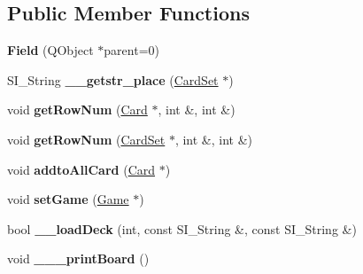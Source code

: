 \subsection*{Public Member Functions}
\begin{DoxyCompactItemize}
\item 
\mbox{\label{class_field_ae52ac347bd3fc1298fe0682c215cc950}} 
{\bfseries Field} (Q\+Object $\ast$parent=0)
\item 
\mbox{\label{class_field_a45b07177d91e5c8e43cc9506a0fc3ee7}} 
S\+I\+\_\+\+String {\bfseries \+\_\+\+\_\+getstr\+\_\+place} (\hyperlink{class_card_set}{Card\+Set} $\ast$)
\item 
\mbox{\label{class_field_a60541c561e9b2298b120a4734336c3f8}} 
void {\bfseries get\+Row\+Num} (\hyperlink{class_card}{Card} $\ast$, int \&, int \&)
\item 
\mbox{\label{class_field_ac44aee7eeb56a276953e00e92364c7ba}} 
void {\bfseries get\+Row\+Num} (\hyperlink{class_card_set}{Card\+Set} $\ast$, int \&, int \&)
\item 
\mbox{\label{class_field_ad73cca756ca943cf7e40a2b54735deab}} 
void {\bfseries addto\+All\+Card} (\hyperlink{class_card}{Card} $\ast$)
\item 
\mbox{\label{class_field_a02bd7bb54ea117328f07909877a20f37}} 
void {\bfseries set\+Game} (\hyperlink{class_game}{Game} $\ast$)
\item 
\mbox{\label{class_field_a63d3baf4b4566fce6421284bb8053ebb}} 
bool {\bfseries \+\_\+\+\_\+load\+Deck} (int, const S\+I\+\_\+\+String \&, const S\+I\+\_\+\+String \&)
\item 
\mbox{\label{class_field_ac09e33b27d97234f8d46e27874649bea}} 
void {\bfseries \+\_\+\+\_\+\+\_\+print\+Board} ()
\end{DoxyCompactItemize}
